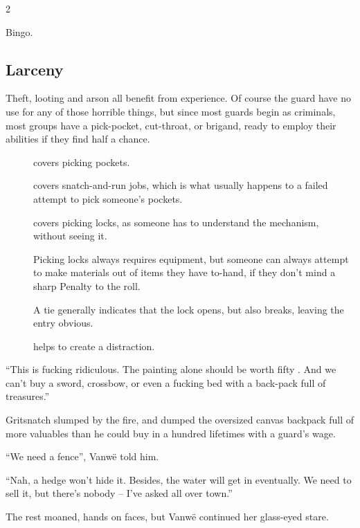 \begin{multicols}{2}
\begin{exampletext}
  Bingo.
\end{exampletext}

\subsection{Larceny}

Theft, looting and arson all benefit from experience.
Of course the \gls{guard} have no use for any of those horrible things, but since most \glspl{guard} begin as criminals, most groups have a pick-pocket, cut-throat, or brigand, ready to employ their abilities if they find half a chance.

\begin{description}
  \item[]
    covers picking pockets.
  \item[]
    covers snatch-and-run jobs, which is what usually happens to a failed attempt to pick someone's pockets.
  \item[]
    covers picking locks, as someone has to understand the mechanism, without seeing it.

    Picking locks always requires equipment, but someone can always attempt to make materials out of items they have to-hand, if they don't mind a sharp Penalty to the roll.

    A tie generally indicates that the lock opens, but also breaks, leaving the entry obvious.

  \item[]
    helps to create a distraction.
\end{description}

\begin{exampletext}
  ``This is fucking ridiculous.
  The painting alone should be worth fifty .
  And we can't buy a sword, crossbow, or even a fucking bed with a back-pack full of treasures.''

  Gritsnatch slumped by the fire, and dumped the oversized canvas backpack full of more valuables than he could buy in a hundred lifetimes with a \gls{guard}'s wage.

  ``We need a fence'', Vanw\"e told him.

  ``Nah, a hedge won't hide it.
  Besides, the water will get in eventually.
  We need to sell it, but there's nobody -- I've asked all over town.''

  The rest moaned, hands on faces, but Vanw\"e continued her glass-eyed stare.


\end{exampletext}
\end{multicols}
